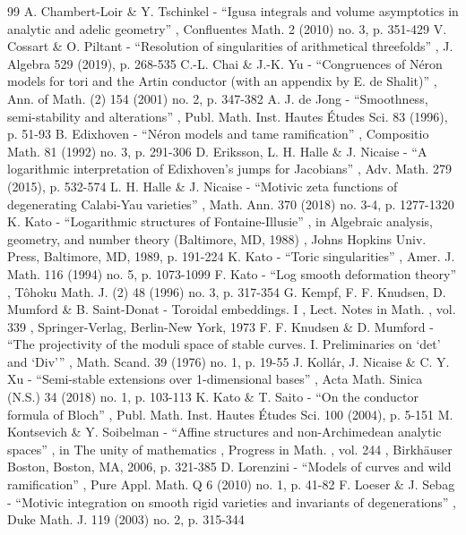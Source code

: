 \documentclass[11pt]{article}
\begin{document}
\begin{thebibliography}{99}
 A. Chambert-Loir \& Y. Tschinkel - “Igusa integrals and volume asymptotics in analytic and adelic geometry” , Confluentes Math. 2 (2010) no. 3, p. 351-429
 V. Cossart \& O. Piltant - “Resolution of singularities of arithmetical threefolds” , J. Algebra 529 (2019), p. 268-535
 C.-L. Chai \& J.-K. Yu - “Congruences of Néron models for tori and the Artin conductor (with an appendix by E. de Shalit)” , Ann. of Math. (2) 154 (2001) no. 2, p. 347-382
 A. J. de Jong - “Smoothness, semi-stability and alterations” , Publ. Math. Inst. Hautes Études Sci. 83 (1996), p. 51-93
 B. Edixhoven - “Néron models and tame ramification” , Compositio Math. 81 (1992) no. 3, p. 291-306
 D. Eriksson, L. H. Halle \& J. Nicaise - “A logarithmic interpretation of Edixhoven’s jumps for Jacobians” , Adv. Math. 279 (2015), p. 532-574
 L. H. Halle \& J. Nicaise - “Motivic zeta functions of degenerating Calabi-Yau varieties” , Math. Ann. 370 (2018) no. 3-4, p. 1277-1320
 K. Kato - “Logarithmic structures of Fontaine-Illusie” , in Algebraic analysis, geometry, and number theory (Baltimore, MD, 1988) , Johns Hopkins Univ. Press, Baltimore, MD, 1989, p. 191-224
 K. Kato - “Toric singularities” , Amer. J. Math. 116 (1994) no. 5, p. 1073-1099
 F. Kato - “Log smooth deformation theory” , Tôhoku Math. J. (2) 48 (1996) no. 3, p. 317-354
 G. Kempf, F. F. Knudsen, D. Mumford \& B. Saint-Donat - Toroidal embeddings. I , Lect. Notes in Math. , vol. 339 , Springer-Verlag, Berlin-New York, 1973
 F. F. Knudsen \& D. Mumford - “The projectivity of the moduli space of stable curves. I. Preliminaries on ‘det’ and ‘Div’” , Math. Scand. 39 (1976) no. 1, p. 19-55
 J. Kollár, J. Nicaise \& C. Y. Xu - “Semi-stable extensions over 1-dimensional bases” , Acta Math. Sinica (N.S.) 34 (2018) no. 1, p. 103-113
 K. Kato \& T. Saito - “On the conductor formula of Bloch” , Publ. Math. Inst. Hautes Études Sci. 100 (2004), p. 5-151
 M. Kontsevich \& Y. Soibelman - “Affine structures and non-Archimedean analytic spaces” , in The unity of mathematics , Progress in Math. , vol. 244 , Birkhäuser Boston, Boston, MA, 2006, p. 321-385
 D. Lorenzini - “Models of curves and wild ramification” , Pure Appl. Math. Q 6 (2010) no. 1, p. 41-82
 F. Loeser \& J. Sebag - “Motivic integration on smooth rigid varieties and invariants of degenerations” , Duke Math. J. 119 (2003) no. 2, p. 315-344

\end{thebibliography}
\end{document}
